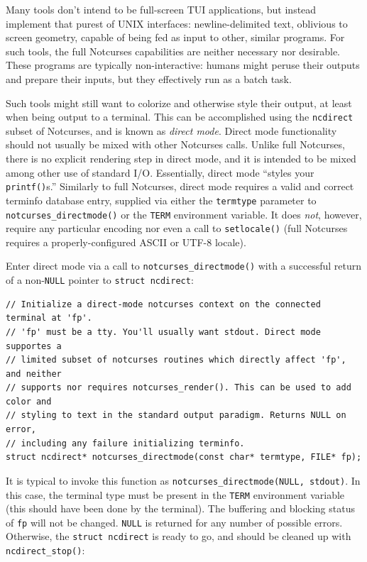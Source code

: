 \documentclass[letterpaper,10pt]{article}
\begin{document}
Many tools don't intend to be full-screen TUI applications, but instead
implement that purest of UNIX interfaces: newline-delimited text, oblivious
to screen geometry, capable of being fed as input to other, similar programs.
For such tools, the full Notcurses capabilities are neither necessary nor
desirable. These programs are typically non-interactive: humans might peruse
their outputs and prepare their inputs, but they effectively run as a batch
task.

 Such tools might still want to colorize and otherwise style their output, at
least when being output to a terminal. This can be accomplished using the
\texttt{ncdirect} subset of Notcurses, and is known as \textit{direct mode}. Direct
mode functionality should not usually be mixed with other Notcurses calls.
Unlike full Notcurses, there is no explicit rendering step in direct mode, and
it is intended to be mixed among other use of standard I/O. Essentially, direct
mode ``styles your \texttt{printf()}s.'' Similarly to full Notcurses, direct mode
requires a valid and correct terminfo database entry, supplied via either the
\texttt{termtype} parameter to \texttt{notcurses\_directmode()} or the \texttt{TERM} environment
variable. It does \textit{not}, however, require any particular encoding nor
even a call to \texttt{setlocale()} (full Notcurses requires a properly-configured
ASCII or UTF-8 locale).

Enter direct mode via a call to \texttt{notcurses\_directmode()} with a successful
return of a non-\texttt{NULL} pointer to \texttt{struct ncdirect}:

\begin{listing}[ht]
\begin{verbatim}
// Initialize a direct-mode notcurses context on the connected terminal at 'fp'.
// 'fp' must be a tty. You'll usually want stdout. Direct mode supportes a
// limited subset of notcurses routines which directly affect 'fp', and neither
// supports nor requires notcurses_render(). This can be used to add color and
// styling to text in the standard output paradigm. Returns NULL on error,
// including any failure initializing terminfo.
struct ncdirect* notcurses_directmode(const char* termtype, FILE* fp);
\end{verbatim}
\end{listing}

It is typical to invoke this function as \texttt{notcurses\_directmode(NULL, stdout)}.
In this case, the terminal type must be present in the \texttt{TERM} environment
variable (this should have been done by the terminal). The buffering and
blocking status of \texttt{fp} will not be changed. \texttt{NULL} is returned for any number
of possible errors. Otherwise, the \texttt{struct ncdirect} is ready to go, and should
be cleaned up with \texttt{ncdirect\_stop()}:
\end{document}
